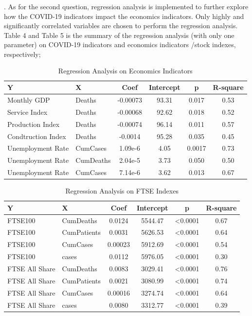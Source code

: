 \documentclass[12pt, a4paper]{report}
\begin{document}
. As for the second question, regression analysis is implemented to further explore how the COVID-19 indicators impact 
the economics indicators. Only highly and significantly correlated variables are chosen to perform the regression analysis.
Table 4 and Table 5 is the summary of the regression analysis (with only one parameter) on COVID-19 indicators and economics indicators 
/stock indexes, respectively;\par
\noindent

\begin{table}[H]
    \begin{center}
    \caption{Regression Analysis on Economics Indicators}
    \begin{tabular}{llcccc}
        \toprule
        Y&X&Coef&Intercept&p&R-square\\
        \midrule
        Monthly GDP&Deaths&-0.00073&93.31&0.017&0.53\\
        Service Index&Deaths&-0.00068&92.62&0.018&0.52\\
        Production Index&Deaths&-0.00074&96.14&0.011&0.57\\
        Condtruction Index&Deaths&-0.0014&95.28&0.035&0.45\\
        Unemployment Rate&CumCases&1.09e-6&4.05&0.0017&0.73\\
        Unemployment Rate&CumDeaths&2.04e-5&3.73&0.050&0.50\\
        Unemployment Rate&CumCases&7.14e-6&3.62&0.013&0.67\\
        \bottomrule
    \end{tabular}
    \end{center}
\end{table}

\begin{table}[H]
    \begin{center}
    \caption{Regression Analysis on FTSE Indexes}
    \begin{tabular}{llcccc}
        \toprule
        Y&X&Coef&Intercept&p&R-square\\
        \midrule
        FTSE100&CumDeaths&0.0124&5544.47&<0.0001&0.67\\
        FTSE100&CumPatients&0.0031&5626.53&<0.0001&0.64\\
        FTSE100&CumCases&0.00023&5912.69&<0.0001&0.54\\
        FTSE100&cases&0.0112&5976.05&<0.0001&0.30\\
        FTSE All Share&CumDeaths&0.0083&3029.41&<0.0001&0.76\\
        FTSE All Share&CumPatients&0.0021&3080.99&<0.0001&0.74\\
        FTSE All Share&CumCases&0.00016&3274.74&<0.0001&0.64\\
        FTSE All Share&cases&0.0080&3312.77&<0.0001&0.39\\
        \bottomrule
    \end{tabular}
    \end{center}
\end{table}
\end{document}
